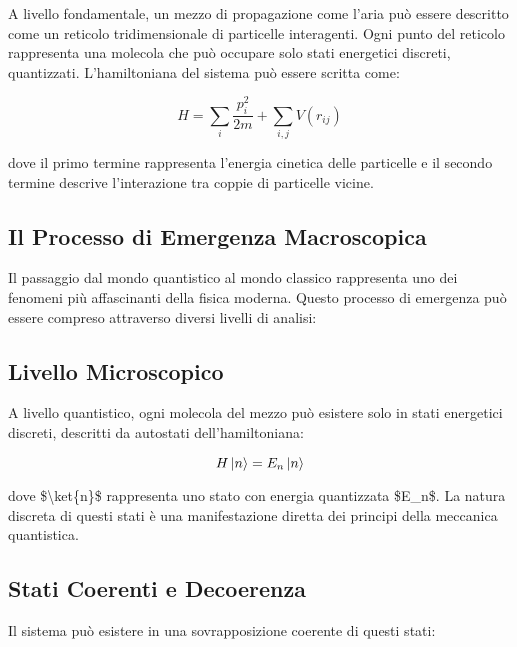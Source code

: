 \documentclass[a4paper,11pt]{article}
\begin{document}
A livello fondamentale, un mezzo di propagazione come l'aria può essere
descritto come un reticolo tridimensionale di particelle interagenti.
Ogni punto del reticolo rappresenta una molecola che può occupare solo
stati energetici discreti, quantizzati. L'hamiltoniana del sistema può
essere scritta come:

\begin{displaymath}
H = \sum_i \frac{p_i^2}{2m} + \sum_{i,j} V(r_{ij})
\end{displaymath}

dove il primo termine rappresenta l'energia cinetica delle particelle e
il secondo termine descrive l'interazione tra coppie di particelle
vicine.

\subsection{Il Processo di Emergenza Macroscopica}\hypertarget{il-processo-di-emergenza-macroscopica}{}\label{il-processo-di-emergenza-macroscopica}

Il passaggio dal mondo quantistico al mondo classico rappresenta uno dei
fenomeni più affascinanti della fisica moderna. Questo processo di
emergenza può essere compreso attraverso diversi livelli di analisi:

\subsection{Livello Microscopico}\hypertarget{livello-microscopico}{}\label{livello-microscopico}

A livello quantistico, ogni molecola del mezzo può esistere solo in
stati energetici discreti, descritti da autostati dell'hamiltoniana:

\begin{displaymath}
H\ket{n} = E_n\ket{n}
\end{displaymath}

dove \$\textbackslash{}ket\{n\}\$ rappresenta uno stato con energia quantizzata \$E\_n\$. La
natura discreta di questi stati è una manifestazione diretta dei
principi della meccanica quantistica.

\subsection{Stati Coerenti e Decoerenza}\hypertarget{stati-coerenti-e-decoerenza}{}\label{stati-coerenti-e-decoerenza}

Il sistema può esistere in una sovrapposizione coerente di questi stati:
\end{document}
